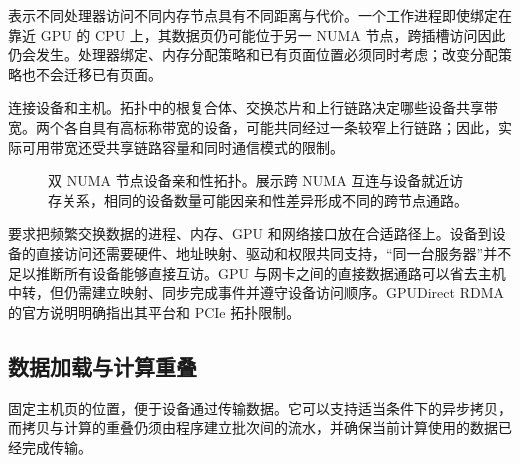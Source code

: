 \documentclass[../textbook.tex]{subfiles}
\begin{document}
表示不同处理器访问不同内存节点具有不同距离与代价。一个工作进程即使绑定在靠近 GPU 的 CPU 上，其数据页仍可能位于另一 NUMA 节点，跨插槽访问因此仍会发生。处理器绑定、内存分配策略和已有页面位置必须同时考虑；改变分配策略也不会迁移已有页面。\cite{linux2024numapolicy}

连接设备和主机。拓扑中的根复合体、交换芯片和上行链路决定哪些设备共享带宽。两个各自具有高标称带宽的设备，可能共同经过一条较窄上行链路；因此，实际可用带宽还受共享链路容量和同时通信模式的限制。

\begin{figure}[htbp]
\centering
{}
\caption[双 NUMA 节点设备亲和性拓扑]{双 NUMA 节点设备亲和性拓扑。展示跨 NUMA 互连与设备就近访存关系，相同的设备数量可能因亲和性差异形成不同的跨节点通路。}\label{fig:infra-numa}
\end{figure}

要求把频繁交换数据的进程、内存、GPU 和网络接口放在合适路径上。设备到设备的直接访问还需要硬件、地址映射、驱动和权限共同支持，“同一台服务器”并不足以推断所有设备能够直接互访。GPU 与网卡之间的直接数据通路可以省去主机中转，但仍需建立映射、同步完成事件并遵守设备访问顺序。GPUDirect RDMA 的官方说明明确指出其平台和 PCIe 拓扑限制。\cite{nvidia2026gpudirect}

\subsection{数据加载与计算重叠}
固定主机页的位置，便于设备通过传输数据。它可以支持适当条件下的异步拷贝，而拷贝与计算的重叠仍须由程序建立批次间的流水，并确保当前计算使用的数据已经完成传输。
\end{document}
